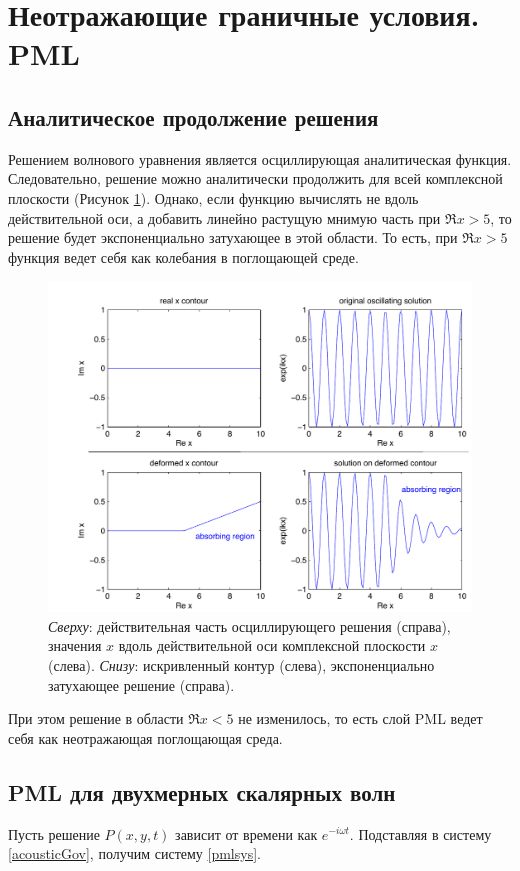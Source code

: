 \documentclass[a4paper, fontsize=14pt]{article}
\begin{document}
\section{Неотражающие граничные условия. PML}

\subsection{Аналитическое продолжение решения}
	Решением волнового уравнения является осциллирующая аналитическая функция. Следовательно, решение
можно аналитически продолжить для всей комплексной плоскости (Рисунок \ref{pmlcont}). Однако, если функцию вычислять не
вдоль действительной оси, а добавить линейно растущую мнимую часть при $\Re x > 5$, то решение будет
экспоненциально затухающее в этой области. То есть, при $\Re x > 5$ функция ведет себя как колебания в
поглощающей среде. \cite{npml}
\begin{figure}[H]
	\centering
	\includegraphics[width=1\columnwidth]{pml-continuation}
	\caption{\emph{Сверху}: действительная часть осциллирующего решения (справа), значения $x$ вдоль
	действительной оси комплексной плоскости $x$ (слева).
	\emph{Снизу}: искривленный контур (слева), экспоненциально затухающее решение (справа). 
	}
	\label{pmlcont}

\end{figure}

При этом решение в области $\Re x < 5$ не изменилось, то есть слой PML ведет себя как неотражающая
поглощающая среда.
\subsection{PML для двухмерных скалярных волн  }
Пусть решение $P(x,y,t)$ зависит от времени как $e^{-i \omega t}$. Подставляя в систему
\ref{acousticGov}, получим систему \ref{pmlsys}.
\end{document}
